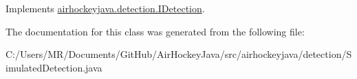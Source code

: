 Implements \hyperlink{interfaceairhockeyjava_1_1detection_1_1_i_detection_a33002ee7b6eda99e49aec27d32dfc198}{airhockeyjava.\+detection.\+I\+Detection}.



The documentation for this class was generated from the following file\+:\begin{DoxyCompactItemize}
\item 
C\+:/\+Users/\+M\+R/\+Documents/\+Git\+Hub/\+Air\+Hockey\+Java/src/airhockeyjava/detection/Simulated\+Detection.\+java\end{DoxyCompactItemize}
